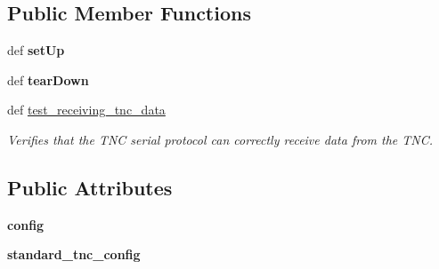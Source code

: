 \subsection*{Public Member Functions}
\begin{DoxyCompactItemize}
\item 
\hypertarget{classhwm_1_1hardware_1_1devices_1_1drivers_1_1kantronics__tnc_1_1tests_1_1test__kantronics__tnc_fb887f0a11150054eea93748489d0600_adf9355d11684926841cc84f6fc72c351}{def {\bfseries set\-Up}}\label{classhwm_1_1hardware_1_1devices_1_1drivers_1_1kantronics__tnc_1_1tests_1_1test__kantronics__tnc_fb887f0a11150054eea93748489d0600_adf9355d11684926841cc84f6fc72c351}

\item 
\hypertarget{classhwm_1_1hardware_1_1devices_1_1drivers_1_1kantronics__tnc_1_1tests_1_1test__kantronics__tnc_fb887f0a11150054eea93748489d0600_ae15cc9efe57039b359cd63ccf85232ce}{def {\bfseries tear\-Down}}\label{classhwm_1_1hardware_1_1devices_1_1drivers_1_1kantronics__tnc_1_1tests_1_1test__kantronics__tnc_fb887f0a11150054eea93748489d0600_ae15cc9efe57039b359cd63ccf85232ce}

\item 
def \hyperlink{classhwm_1_1hardware_1_1devices_1_1drivers_1_1kantronics__tnc_1_1tests_1_1test__kantronics__tnc_fb887f0a11150054eea93748489d0600_af19973ea3e9d709f9687ce7b341495bf}{test\-\_\-receiving\-\_\-tnc\-\_\-data}
\begin{DoxyCompactList}\small\item\em Verifies that the T\-N\-C serial protocol can correctly receive data from the T\-N\-C. \end{DoxyCompactList}\end{DoxyCompactItemize}
\subsection*{Public Attributes}
\begin{DoxyCompactItemize}
\item 
\hypertarget{classhwm_1_1hardware_1_1devices_1_1drivers_1_1kantronics__tnc_1_1tests_1_1test__kantronics__tnc_fb887f0a11150054eea93748489d0600_a103e96f1be6ede30a76972cce5e73ea3}{{\bfseries config}}\label{classhwm_1_1hardware_1_1devices_1_1drivers_1_1kantronics__tnc_1_1tests_1_1test__kantronics__tnc_fb887f0a11150054eea93748489d0600_a103e96f1be6ede30a76972cce5e73ea3}

\item 
\hypertarget{classhwm_1_1hardware_1_1devices_1_1drivers_1_1kantronics__tnc_1_1tests_1_1test__kantronics__tnc_fb887f0a11150054eea93748489d0600_a9b4ab0433887c747e1c1a5ecd2a7c919}{{\bfseries standard\-\_\-tnc\-\_\-config}}\label{classhwm_1_1hardware_1_1devices_1_1drivers_1_1kantronics__tnc_1_1tests_1_1test__kantronics__tnc_fb887f0a11150054eea93748489d0600_a9b4ab0433887c747e1c1a5ecd2a7c919}

\end{DoxyCompactItemize}

